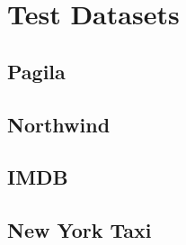 \chapter{Test Datasets}
\lipsum[1-2]
\section{Pagila}
\lipsum[3-4]
\section{Northwind}
\lipsum[5-6]
\section{IMDB}
\lipsum[7-8]
\section{New York Taxi}
\lipsum[9-10]